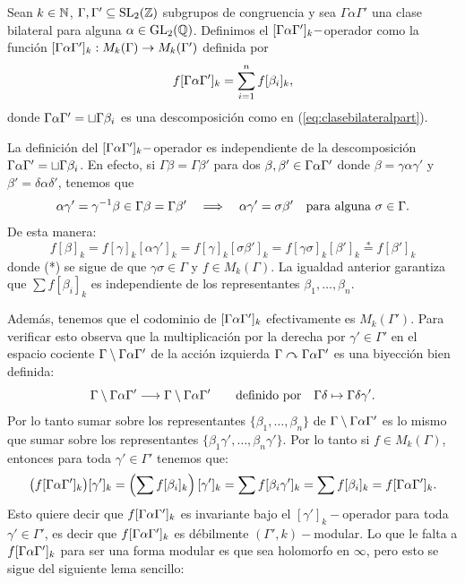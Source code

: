 \begin{defin}
  Sean $k\in\mathbb{N}$, $\Gamma,\Gamma'\subseteq\mathrm{SL}_2(\mathbb{Z})$ subgrupos de congruencia y sea
  $\Gamma\alpha\Gamma'$ una clase bilateral para alguna $\alpha\in\mathrm{GL}_2(\mathbb{Q})$. Definimos el
  $[\Gamma\alpha\Gamma']_k-$operador como la funci\'on $[\Gamma\alpha\Gamma']_k:M_k(\Gamma)\rightarrow M_k(\Gamma')$ definida por
  \[
    f[\Gamma\alpha\Gamma']_k=\sum_{i=1}^nf[\beta_i]_k,
  \]
  donde $\Gamma\alpha\Gamma'=\sqcup\Gamma\beta_i$ es una descomposici\'on como en (\ref{eq:clasebilateralpart}).
\end{defin}

\begin{nota}
  La definici\'on del $[\Gamma\alpha\Gamma']_k-$operador es independiente de la descomposici\'on
  $\Gamma\alpha\Gamma'=\sqcup\Gamma\beta_i$. En efecto, si $\Gamma\beta=\Gamma\beta'$ para dos $\beta,\beta'\in\Gamma\alpha\Gamma'$
  donde $\beta=\gamma\alpha\gamma'$ y $\beta'=\delta\alpha\delta'$, tenemos que
  \[
    \alpha\gamma'=\gamma^{-1}\beta\in\Gamma\beta=\Gamma\beta'\quad\Longrightarrow\quad
    \alpha\gamma'=\sigma\beta'
    \quad\text{para alguna }\sigma\in\Gamma.
  \]
  De esta manera:
  \[
    f[\beta]_k=f[\gamma]_k[\alpha\gamma']_k= f[\gamma]_k[\sigma\beta']_k=f[\gamma\sigma]_k[\beta']_k
    \overset{*}{=} f[\beta']_k
  \]
  donde (*) se sigue de que $\gamma\sigma\in\Gamma$ y $f\in M_k(\Gamma)$. La igualdad anterior
  garantiza que $\sum f[\beta_i]_k$ es independiente de los representantes $\beta_1,\ldots,\beta_n$.

  Adem\'as, tenemos que el codominio de $[\Gamma\alpha\Gamma']_k$ efectivamente es $M_k(\Gamma')$. Para verificar
  esto observa que la multiplicaci\'on por la derecha por $\gamma'\in\Gamma'$ en el espacio cociente
  $\Gamma\setminus\Gamma\alpha\Gamma'$ de la acci\'on izquierda $\Gamma\curvearrowright\Gamma\alpha\Gamma'$ es una biyecci\'on
  bien definida:
  \[
    \Gamma\setminus\Gamma\alpha\Gamma'\longrightarrow\Gamma\setminus\Gamma\alpha\Gamma' \qquad\text{definido por}\quad
    \Gamma\delta\mapsto \Gamma\delta\gamma'.
  \]
  Por lo tanto sumar sobre los representantes $\{\beta_1,\ldots,\beta_n\}$
  de $\Gamma\setminus\Gamma\alpha\Gamma'$ es lo mismo que sumar sobre los representantes
  $\{\beta_1\gamma',\ldots,\beta_n\gamma'\}$. Por lo tanto si $f\in M_k(\Gamma)$, entonces para toda
  $\gamma'\in\Gamma'$ tenemos que:
  \[
    \big(f[\Gamma\alpha\Gamma']_k\big)[\gamma']_k=\left( \sum f [\beta_i]_k \right)[\gamma']_k=\sum f[\beta_i\gamma']_k=
    \sum f[\beta_i]_k=f[\Gamma\alpha\Gamma']_k.
  \]
  Esto quiere decir que $f[\Gamma\alpha\Gamma']_k$ es invariante bajo el $[\gamma']_k-$operador para toda
  $\gamma'\in\Gamma'$, es decir que $f[\Gamma\alpha\Gamma']_k$ es d\'ebilmente $(\Gamma',k)-$modular. Lo que le
  falta a $f[\Gamma\alpha\Gamma']_k$ para ser una forma modular es que sea holomorfo en $\infty$, pero esto se
  sigue del siguiente lema sencillo:


\end{nota}
